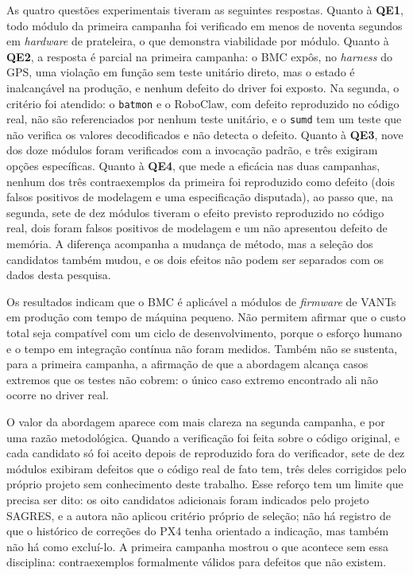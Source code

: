 As quatro questões experimentais tiveram as seguintes respostas. Quanto à
\textbf{QE1}, todo módulo da primeira campanha foi verificado em menos de
noventa segundos em \textit{hardware} de prateleira, o que demonstra
viabilidade por módulo. Quanto à \textbf{QE2}, a resposta é parcial na primeira campanha: o BMC
expôs, no \textit{harness} do GPS, uma violação em função sem teste unitário
direto, mas o estado é inalcançável na produção, e nenhum defeito do driver foi
exposto. Na segunda, o critério foi atendido: o \texttt{batmon} e o RoboClaw, com
defeito reproduzido no código real, não são referenciados por nenhum teste
unitário, e o \texttt{sumd} tem um teste que não verifica os valores decodificados
e não detecta o defeito. Quanto à \textbf{QE3}, nove dos doze módulos
foram verificados com a invocação padrão, e três exigiram opções específicas. Quanto à \textbf{QE4}, que mede a eficácia nas duas campanhas, nenhum dos três contraexemplos da primeira foi reproduzido como defeito (dois falsos positivos de modelagem e uma especificação disputada), ao passo que, na segunda, sete de dez módulos tiveram o efeito previsto reproduzido no código real, dois foram falsos positivos de modelagem e um não apresentou defeito de memória. A diferença acompanha a mudança de método, mas a seleção dos candidatos também mudou, e os dois efeitos não podem ser separados com os dados desta pesquisa.

Os resultados indicam que o BMC é aplicável a módulos de \textit{firmware} de
VANTs em produção com tempo de máquina pequeno. Não permitem afirmar que o
custo total seja compatível com um ciclo de desenvolvimento, porque o esforço
humano e o tempo em integração contínua não foram medidos. Também não se
sustenta, para a primeira campanha, a afirmação de que a abordagem alcança
casos extremos que os testes não cobrem: o único caso extremo encontrado ali
não ocorre no driver real.

O valor da abordagem aparece com mais clareza na segunda campanha, e por uma
razão metodológica. Quando a verificação foi feita sobre o código original, e
cada candidato só foi aceito depois de reproduzido fora do verificador, sete de
dez módulos exibiram defeitos que o código real de fato tem, três deles
corrigidos pelo próprio projeto sem conhecimento deste trabalho. Esse reforço tem um limite que precisa ser dito: os oito candidatos adicionais foram indicados pelo projeto SAGRES, e a autora não aplicou critério próprio de seleção; não há registro de que o histórico de correções do PX4 tenha orientado a indicação, mas também não há como excluí-lo. A primeira
campanha mostrou o que acontece sem essa disciplina: contraexemplos formalmente
válidos para defeitos que não existem.

